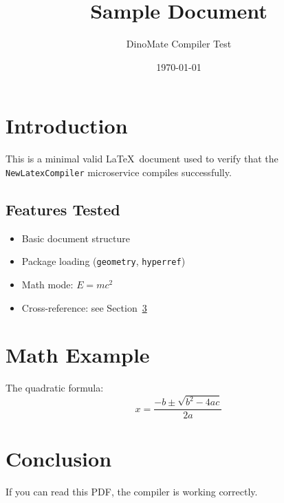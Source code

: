 \documentclass[11pt,a4paper]{article}
\title{Sample Document}
\author{DinoMate Compiler Test}
\date{\today}
\begin{document}
\maketitle

\section{Introduction}
This is a minimal valid \LaTeX\ document used to verify that the
\texttt{NewLatexCompiler} microservice compiles successfully.

\subsection{Features Tested}
\begin{itemize}
    \item Basic document structure
    \item Package loading (\texttt{geometry}, \texttt{hyperref})
    \item Math mode: $E = mc^2$
    \item Cross-reference: see Section~\ref{sec:conclusion}
\end{itemize}

\section{Math Example}
The quadratic formula:
\[
    x = \frac{-b \pm \sqrt{b^2 - 4ac}}{2a}
\]

\section{Conclusion}
\label{sec:conclusion}
If you can read this PDF, the compiler is working correctly.
\end{document}
